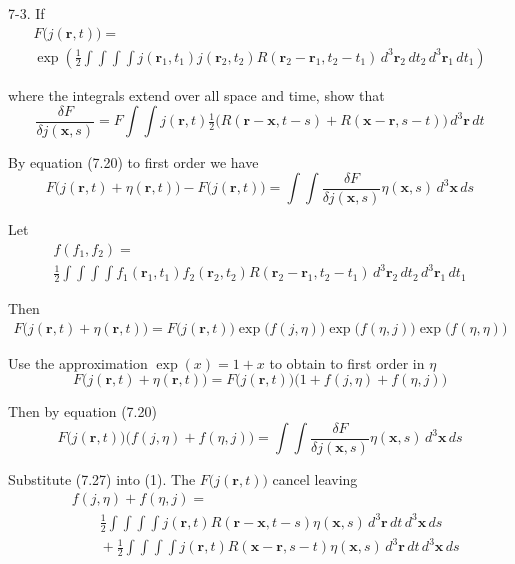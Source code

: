 \documentclass[12pt]{article}
\begin{document}
7-3.
If
\begin{multline*}
F\big(j(\mathbf r,t)\big)=
\\
\exp\left(
\frac{1}{2}\int\int\int\int
j(\mathbf r_1,t_1)j(\mathbf r_2,t_2)R(\mathbf r_2-\mathbf r_1,t_2-t_1)
\,d^3\mathbf r_2\,dt_2\,d^3\mathbf r_1\,dt_1
\right)
\end{multline*}

where the integrals extend over all space and time, show that
\begin{equation*}
\frac{\delta F}{\delta j(\mathbf x,s)}
=F\int\int j(\mathbf r,t)
\tfrac{1}{2}
\big(R(\mathbf r-\mathbf x,t-s)+R(\mathbf x-\mathbf r,s-t)\big)
\,d^3\mathbf r\,dt
\tag{7.27}
\end{equation*}

By equation (7.20) to first order we have
\begin{equation*}
F\big(j(\mathbf r,t)+\eta(\mathbf r,t)\big)
-F\big(j(\mathbf r,t)\big)
=\int\int
\frac{\delta F}{\delta j(\mathbf x,s)}\eta(\mathbf x,s)\,d^3\mathbf x\,ds
\end{equation*}

Let
\begin{multline*}
f(f_1,f_2)=
\\
\frac{1}{2}
\int\int\int\int
f_1(\mathbf r_1,t_1)f_2(\mathbf r_2,t_2)R(\mathbf r_2-\mathbf r_1,t_2-t_1)
\,d^3\mathbf r_2\,dt_2\,d^3\mathbf r_1\,dt_1
\end{multline*}

Then
\begin{align*}
F\big(j(\mathbf r,t)+\eta(\mathbf r,t)\big)=F\big(j(\mathbf r,t)\big)
\exp\big(f(j,\eta)\big)\exp\big(f(\eta,j)\big)\exp\big(f(\eta,\eta)\big)
\end{align*}

Use the approximation $\exp(x)=1+x$ to obtain to first order in $\eta$
\begin{equation*}
F\big(j(\mathbf r,t)+\eta(\mathbf r,t)\big)
=F\big(j(\mathbf r,t)\big)\big(1+f(j,\eta)+f(\eta,j)\big)
\end{equation*}

Then by equation (7.20)
\begin{equation*}
F\big(j(\mathbf r,t)\big)\big(f(j,\eta)+f(\eta,j)\big)
=\int\int
\frac{\delta F}{\delta j(\mathbf x,s)}\eta(\mathbf x,s)\,d^3\mathbf x\,ds
\tag{1}
\end{equation*}

Substitute (7.27) into (1).
The $F\big(j(\mathbf r,t)\big)$ cancel leaving
\begin{align*}
&f(j,\eta)+f(\eta,j)=
\\
&\qquad\frac{1}{2}\int\int\int\int
j(\mathbf r,t)R(\mathbf r-\mathbf x,t-s)\eta(\mathbf x,s)\,d^3\mathbf r\,dt\,d^3\mathbf x\,ds
\\
&\qquad{}+\frac{1}{2}\int\int\int\int
j(\mathbf r,t)R(\mathbf x-\mathbf r,s-t)\eta(\mathbf x,s)\,d^3\mathbf r\,dt\,d^3\mathbf x\,ds
\end{align*}
\end{document}
